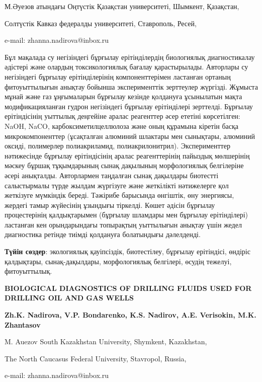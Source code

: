 \begin{affil}
М.Әуезов атындағы Оңтүстік Қазақстан университеті, Шымкент, Қазақстан,

Солтүстік Кавказ федералды университеті, Ставрополь, Ресей,

e-mail: zhanna.nadirova@inbox.ru
\end{affil}

Бұл мақалада су негізіндегі бұрғылау ерітінділердің биологиялық
диагностикалау әдістері және олардың токсикологиялық бағалау
қарастырылады. Авторлары су негізіндегі бұрғылау ерітінділер\-інің
компоненттерімен ластанған ортаның фитоуыттылығын анықтау бойынша
эксперименттік зерттеулер жүргізді. Жұмыста мұнай және газ ұңғымаларын
бұрғылау кезінде қолдануға ұсынылатын мақта модификацияланған гудрон
негізіндегі бұрғылау ерітінділері зерттелді. Бұрғылау ерітіндісінің
уыттылық деңгейіне аралас реагенттер әсер ететіні көрсетілген: NaOH,
NaCO, карбоксиметилцеллюлоза және оның
құрамына кіретін басқа микрокомпоненттер (ұсақталған алюминий шлактары
мен сынықтары, алюминий оксиді, полимерлер полиакриламид,
полиакрилонитрил). Эксперименттер нәтижесінде бұрғылау ерітіндісінің
аралас реагенттерінің пайыздық мөлшерінің мәскеу бұршақ тұқымдарының
сынақ дақылының морфологиялық белгілеріне әсері анықталды. Авторлармен
таңдалған сынақ дақылдары биотестті салыстырмалы түрде жылдам жүргізуге
және жеткілікті нәтижелерге қол жеткізуге мүмкіндік береді. Тәжірибе
барысында өнгіштік, өну энергиясы, жердегі тамыр жүйесінің ұзындығы
тіркелді. Көшет әдісін бұрғылау процестерінің қалдықтарымен (бұрғылау
шламдары мен бұрғылау ерітінділері) ластанған кен орындарындағы
топырақтың уыттылығын анықтау үшін жедел диагностика ретінде тиімді
қолдануға болатындығы дәлелденді.

{\bfseries Түйін сөздер}: экологиялық қауіпсіздік, биотестілеу, бұрғылау
ерітіндісі, өндіріс қалдықтары, сынақ-дақылдары, морфологиялық
белгілері, өсудің тежелуі, фитоуыттылық.

\begin{header}
{\bfseries BIOLOGICAL DIAGNOSTICS OF DRILLING FLUIDS USED FOR DRILLING OIL AND GAS WELLS}

{\bfseries
{}Zh.K. Nadirova\envelope,
V.P. Bondarenko,
K.S. Nadirov,
A.E. Verisokin,
M.K. Zhantasov
}
\end{header}

\begin{affil}
M. Auezov South Kazakhstan University, Shymkent, Kazakhstan,

The North Caucasus Federal University, Stavropol, Russia,

e-mail: zhanna.nadirova@inbox.ru
\end{affil}

